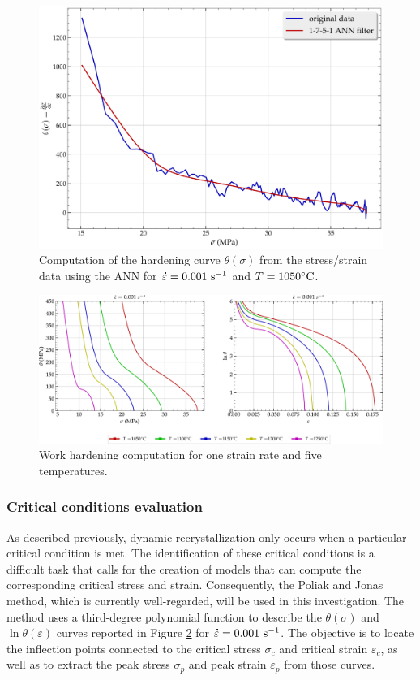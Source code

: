 \documentclass[metals,article,submit,pdftex,moreauthors]{Definitions/mdpi}
\DeclareRobustCommand{\mdot}[1]{\accentset{\mbox{\bfseries .}}{#1}}
\DeclareRobustCommand{\ps}{\text{s}^{-1}}
\begin{document}
\begin{figure}[H]
\centering
\includegraphics[width=0.7\columnwidth]{Figures/AnnTheta}
\caption{Computation of the hardening curve $\theta(\sigma)$ from the stress/strain data using the ANN for $\mdot\varepsilon=0.001~\ps$ and $T=1050\celsius$.}
\label{fig:AnnTheta}
\end{figure}

\begin{figure}[H]
\centering
\includegraphics[width=0.99\columnwidth]{Figures/nThetaOP}
\caption{Work hardening computation for one strain rate and five temperatures.}
\label{fig:nThetaOP}
\end{figure}

\subsubsection{Critical conditions evaluation\label{subsec:CrConditions}}

As described previously, dynamic recrystallization only occurs when a particular critical condition is met.
The identification of these critical conditions is a difficult task that calls for the creation of models that can compute the corresponding critical stress and strain.
Consequently, the Poliak and Jonas \cite{Poliak-1996,Poliak-2003,Poliak-2003-2,Jonas-2003} method, which is currently well-regarded, will be used in this investigation.
The method uses a third-degree polynomial function to describe the $\theta(\sigma)$ and $\ln \theta(\varepsilon)$ curves reported in Figure \ref{fig:nThetaOP} for $\mdot\varepsilon=0.001~\ps$.
The objective is to locate the inflection points connected to the critical stress $\sigma_c$ and critical strain $\varepsilon_c$, as well as to extract the peak stress $\sigma_p$ and peak strain $\varepsilon_p$ from those curves.
\end{document}
